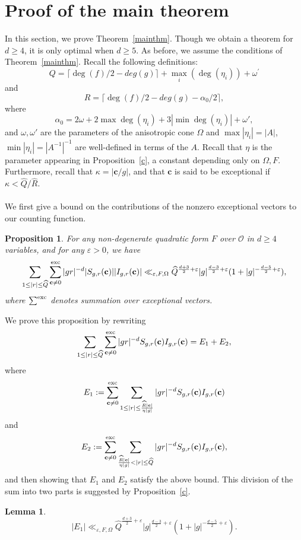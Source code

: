 \documentclass[10pt]{amsart}
\theoremstyle{plain}
\theoremstyle{plain}
\newtheorem{proposition}[theorem]{Proposition}
\newtheorem{lemma}[theorem]{Lemma}
\renewcommand{\vec}[1]{\mathbf{#1}}
\theoremstyle{remark}
\theoremstyle{definition}
\newcommand{\hQ}{\widehat{Q}}
\newcommand{\hR}{\widehat{R}}
\newcommand{\exc}{\textup{exc}}
\begin{document}
\section{Proof of the main theorem}\label{finalproof}
In this section, we prove Theorem~\ref{mainthm}. Though we obtain a theorem for $d\geq 4$, it is only optimal when $d\geq 5$. As before, we assume the conditions of Theorem~\ref{mainthm}. Recall the following definitions:
\[Q=\lceil{\deg(f)/2} -deg(g)\rceil +\max_{i}(\deg(\eta_i))+\omega^{\prime}\]
and
\[R=\lceil{\deg(f)/2} -deg(g)-\alpha_0/2\rceil,\]
where
\[\alpha_0=2\omega+2\max{\deg(\eta_i)}+3|\min\deg(\eta_i)|+\omega',\]
and $\omega,\omega'$ are the parameters of the anisotropic cone $\Omega$ and $\max|\eta_i|=|A|$, $\min|\eta_i|=|A^{-1}|^{-1}$ are well-defined in terms of the $A$. Recall that $\eta$ is the parameter appearing in Proposition~\ref{c}, a constant depending only on $\Omega,F$. Furthermore, recall that $\kappa=\left|\vec{c}/g\right|$, and that $\vec{c}$ is said to be exceptional if $\kappa<\hQ/\hR$.\\
\\
We first give a bound on the contributions of the nonzero exceptional vectors to our counting function.
\begin{proposition}\label{prop:small}For any non-degenerate quadratic form $F$ over $\mathcal{O}$ in $d\geq 4$ variables, and for any $\varepsilon>0$, we have
\[\sum_{1\leq |r|\leq\hQ}\sum_{\vec{c}\neq 0}^{\exc}|gr|^{-d}|S_{g,r}(\vec{c})||I_{g,r}(\vec{c})|\ll_{\varepsilon,F,\Omega} \hQ^{\frac{d+3}{2}+\varepsilon}|g|^{\frac{d-3}{2}+\varepsilon}(1+|g|^{-\frac{d-5}{2}+\varepsilon}),\]
where $\sum^{\exc}$ denotes summation over exceptional vectors.
\end{proposition}
We prove this proposition by rewriting
\[\sum_{1\leq |r|\leq\hQ}\sum_{\vec{c}\neq 0}^{\exc}|gr|^{-d}S_{g,r}(\vec{c})I_{g,r}(\vec{c})=E_1+E_2,\]
where
\[E_1:=\sum_{\vec{c}\neq 0}^{\exc}\sum_{1\leq |r|\leq\frac{\hR |\vec{c}|}{\eta |g|}}|gr|^{-d}S_{g,r}(\vec{c})I_{g,r}(\vec{c})\]
and
\[E_2:=\sum_{\vec{c}\neq 0}^{\exc}\sum_{\frac{\hR |\vec{c}|}{\eta |g|}< |r|\leq\hQ}|gr|^{-d}S_{g,r}(\vec{c})I_{g,r}(\vec{c}),\]
and then showing that $E_1$ and $E_2$ satisfy the above bound. This division of the sum into two parts is suggested by Proposition~\ref{c}.
\begin{lemma}\label{lem:e1}
\[|E_1|\ll_{\varepsilon,F,\Omega} \hQ^{\frac{d+3}{2}+\varepsilon}|g|^{\frac{d-3}{2}+\varepsilon}(1+|g|^{-\frac{d-5}{2}+\varepsilon}).\]
\end{lemma}
\end{document}
